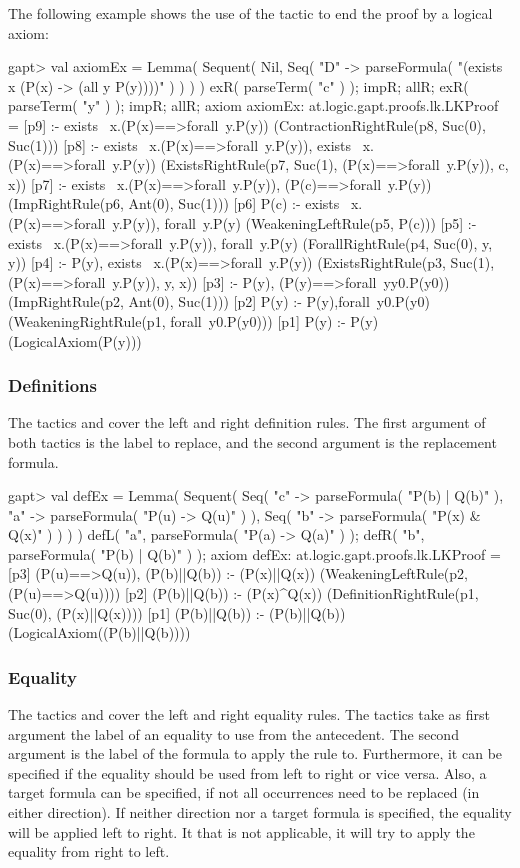 \documentclass{article}
\newcommand{\cli}[1]{{\ttfamily {#1}}}
\begin{document}
The following example shows the use of the \cli{axiom} tactic to end the proof by a logical axiom:

\begin{clilisting}
gapt> val axiomEx = Lemma( Sequent( Nil, Seq( "D" -> parseFormula( "(exists x (P(x) -> (all y P(y))))" ) ) ) ) { exR( parseTerm( "c" ) ); impR; allR; exR( parseTerm( "y" ) ); impR; allR; axiom }
axiomEx: at.logic.gapt.proofs.lk.LKProof =
[p9]  :- exists~ x.(P(x)==>forall~y.P(y))    (ContractionRightRule(p8, Suc(0), Suc(1)))
[p8]  :- exists~ x.(P(x)==>forall~y.P(y)), exists~ x.(P(x)==>forall~y.P(y))    (ExistsRightRule(p7, Suc(1), (P(x)==>forall~y.P(y)), c, x))
[p7]  :- exists~ x.(P(x)==>forall~y.P(y)), (P(c)==>forall~y.P(y))    (ImpRightRule(p6, Ant(0), Suc(1)))
[p6] P(c) :- exists~ x.(P(x)==>forall~y.P(y)), forall~y.P(y)    (WeakeningLeftRule(p5, P(c)))
[p5]  :- exists~ x.(P(x)==>forall~y.P(y)), forall~y.P(y)    (ForallRightRule(p4, Suc(0), y, y))
[p4]  :- P(y), exists~ x.(P(x)==>forall~y.P(y))    (ExistsRightRule(p3, Suc(1), (P(x)==>forall~y.P(y)), y, x))
[p3]  :- P(y), (P(y)==>forall~yy0.P(y0))    (ImpRightRule(p2, Ant(0), Suc(1)))
[p2] P(y) :- P(y),forall~y0.P(y0)    (WeakeningRightRule(p1, forall~y0.P(y0)))
[p1] P(y) :- P(y)    (LogicalAxiom(P(y)))
\end{clilisting}

\subsubsection*{Definitions}
The tactics \cli{defL} and \cli{defR} cover the left and right definition rules. The first argument of both tactics is the label to replace, and the second argument is the replacement formula.

\begin{clilisting}
gapt> val defEx = Lemma( Sequent( Seq( "c" -> parseFormula( "P(b) | Q(b)" ), "a" -> parseFormula( "P(u) -> Q(u)" ) ), Seq( "b" -> parseFormula( "P(x) & Q(x)" ) ) ) ) { defL( "a", parseFormula( "P(a) -> Q(a)" ) ); defR( "b", parseFormula( "P(b) | Q(b)" ) ); axiom }
defEx: at.logic.gapt.proofs.lk.LKProof =
[p3] (P(u)==>Q(u)), (P(b)||Q(b)) :- (P(x)||Q(x))    (WeakeningLeftRule(p2, (P(u)==>Q(u))))
[p2] (P(b)||Q(b)) :- (P(x)^Q(x))    (DefinitionRightRule(p1, Suc(0), (P(x)||Q(x))))
[p1] (P(b)||Q(b)) :- (P(b)||Q(b))    (LogicalAxiom((P(b)||Q(b))))
\end{clilisting}

\subsubsection*{Equality}
The tactics \cli{eqL} and \cli{eqR} cover the left and right equality rules. The tactics take as first argument the label of an equality to use from the antecedent. The second argument is the label of the formula to apply the rule to. Furthermore, it can be specified if the equality should be used from left to right or vice versa. Also, a target formula can be specified, if not all occurrences need to be replaced (in either direction). If neither direction nor a target formula is specified, the equality will be applied left to right. It that is not applicable, it will try to apply the equality from right to left.
\end{document}
